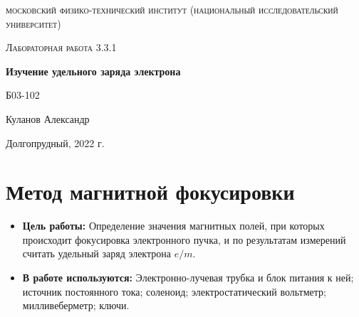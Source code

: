 \documentclass[a4paper, 12pt]{article}
\begin{document}
\begin{titlepage}
	\centering
	\vspace{5cm}
	{\scshape\LARGE московский физико-технический институт (национальный исследовательский университет) \par}
	\vspace{6cm}
	{\scshape\Large Лабораторная работа 3.3.1 \par}
	{\huge\bfseries Изучение удельного заряда электрона \par}
	\vspace{1cm}
	\vfill
\begin{flushright}
	{\large Б03-102}\par
	\vspace{0.3cm}
	{\LARGE Куланов Александр}
\end{flushright}
	

	\vfill


	Долгопрудный, 2022 г.
\end{titlepage}

\section{Метод магнитной фокусировки}


\begin{itemize}
	\item \textbf{Цель работы:} Определение значения магнитных полей, при которых происходит фокусировка электронного пучка, и по результатам измерений считать удельный заряд электрона $e/m$.
    \item \textbf{В работе используются:} Электронно-лучевая трубка и блок питания к ней; источник постоянного тока; соленоид; электростатический вольтметр; милливеберметр; ключи.
    
\end{itemize}
\end{document}
